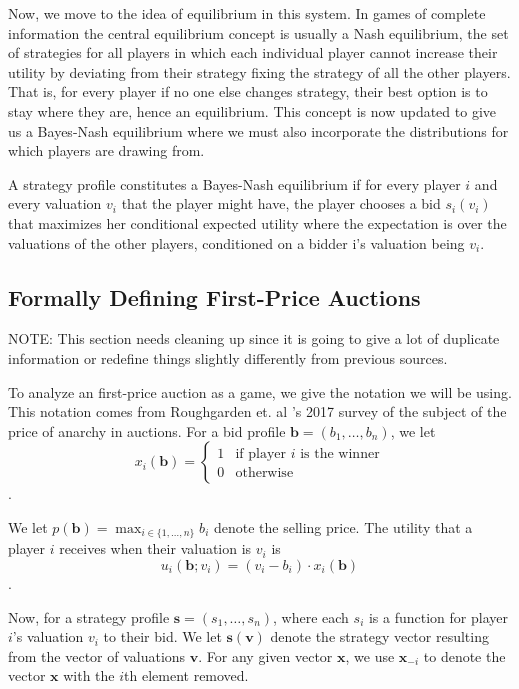 \documentclass[12pt,twoside]{reedthesis}
\begin{document}
Now, we move to the idea of equilibrium in this system. In games of complete information the central equilibrium concept is usually a Nash equilibrium, the set of strategies for all players in which each individual player cannot increase their utility by deviating from their strategy fixing the strategy of all the other players. That is, for every player if no one else changes strategy, their best option is to stay where they are, hence an equilibrium. This concept is now updated to give us a Bayes-Nash equilibrium where we must also incorporate the distributions for which players are drawing from. 

\begin{dfn}
	A strategy profile constitutes a Bayes-Nash equilibrium if for every player $i$ and every valuation $v_i$ that the player might have, the player chooses a bid $s_i(v_i)$ that maximizes her conditional expected utility where the expectation is over the valuations of the other players, conditioned on a bidder i's valuation being $v_i$. 
\end{dfn}

\subsection{Formally Defining First-Price Auctions}
NOTE: This section needs cleaning up since it is going to give a lot of duplicate information or redefine things slightly differently from previous sources.

To analyze an first-price auction as a game, we give the notation we will be using. This notation comes from Roughgarden et. al 's 2017 survey of the subject of the price of anarchy in auctions. For a bid profile $\textbf{b} = (b_1, \ldots, b_n)$, we let 
\[
	x_i(\textbf{b}) =
	\begin{cases}
		1 & \text{if player $i$ is the winner} \\
		0 & \text{otherwise}
	\end{cases}
\].

We let $p(\textbf{b}) = \max_{i \in \{1, \ldots, n\} } b_i$ denote the selling price. The utility that a player $i$ receives when their valuation is $v_i$ is 
$$u_i(\textbf{b}; v_i) = (v_i - b_i) \cdot x_i(\textbf{b})$$. 

Now, for a strategy profile $\textbf{s} = (s_1, \ldots, s_n)$, where each $s_i$ is a function for player $i$'s valuation $v_i$ to their bid. We let $\textbf{s}(\textbf{v})$ denote the strategy vector resulting from the vector of valuations $\textbf{v}$. For any given vector $\textbf{x}$, we use $\textbf{x}_{-i}$ to denote the vector $\textbf{x}$ with the $i$th element removed. 
\end{document}
